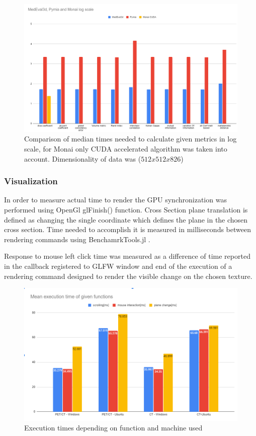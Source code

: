 \documentclass{juliacon}
\begin{document}
\begin{figure}[h!]
	\centering
	\includegraphics[width=\columnwidth]{bk.png}
	\caption{Comparison of median times needed to calculate given metrics in log scale, for Monai only CUDA accelerated algorithm was taken into account. Dimensionality of data was ($ 512x512x826 $)  }
	\label{fig:bk}
\end{figure}

\subsubsection{Visualization}

In order to measure actual time to  render the GPU synchronization was performed using OpenGl  glFinish() function.
Cross Section plane translation is defined as changing the single coordinate which defines the plane in the chosen cross section. Time needed to accomplish it is measured in milliseconds between rendering commands using BenchamrkTools.jl \cite{BenchmarkTools}. 

Response to mouse left click time was measured as a difference of time reported in the callback registered to GLFW window and end of the execution of a rendering command designed to render the visible change on the chosen texture.

\begin{figure}[t!]
	\centering
	\includegraphics[width=\columnwidth]{Przechwytywanie.png}
	\caption{Execution times depending on function and machine used}
	\label{fig:Przechwytywanie}
	\centering
\end{figure}
\end{document}
